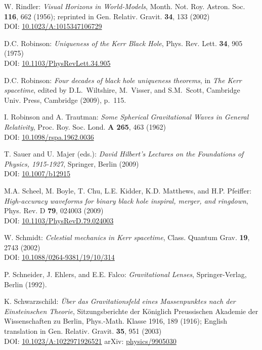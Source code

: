 \begin{thebibliography}{123}
W. Rindler: {\em Visual Horizons in World-Models},
Month. Not. Roy. Astron. Soc. {\bf 116}, 662 (1956);
reprinted in Gen. Relativ. Gravit. {\bf 34}, 133 (2002)\\
DOI: \href{https://doi.org/10.1023/A:1015347106729}{10.1023/A:1015347106729}

D.C. Robinson: {\em Uniqueness of the Kerr Black Hole},
Phys. Rev. Lett. {\bf 34}, 905 (1975)\\
DOI: \href{https://doi.org/10.1103/PhysRevLett.34.905}{10.1103/PhysRevLett.34.905}

D.C. Robinson:
{\em Four decades of black hole uniqueness theorems},
in {\em The Kerr spacetime}, edited by D.L.~Wiltshire, M.~Visser, and S.M.~Scott,
Cambridge Univ. Press, Cambridge (2009), p.~115.

I. Robinson and A. Trautman: {\em Some Spherical Gravitational Waves in General Relativity},
Proc. Roy. Soc. Lond. {\bf A 265}, 463 (1962)\\
DOI: \href{https://doi.org/10.1098/rspa.1962.0036}{10.1098/rspa.1962.0036}

T. Sauer and U. Majer (eds.):
{\em David Hilbert’s Lectures on the Foundations of Physics, 1915-1927},
Springer, Berlin (2009)\\
DOI: \href{https://doi.org/10.1007/b12915}{10.1007/b12915}

M.A. Scheel, M. Boyle, T. Chu, L.E. Kidder, K.D. Matthews, and H.P. Pfeiffer:
{\em High-accuracy waveforms for binary black hole inspiral, merger, and ringdown},
Phys. Rev. D {\bf 79}, 024003 (2009)\\
DOI: \href{https://doi.org/10.1103/PhysRevD.79.024003}{10.1103/PhysRevD.79.024003}

W. Schmidt:
{\em Celestial mechanics in Kerr spacetime},
Class. Quantum Grav. {\bf 19}, 2743 (2002)\\
DOI: \href{https://doi.org/10.1088/0264-9381/19/10/314}{10.1088/0264-9381/19/10/314}

P. Schneider, J. Ehlers, and E.E. Falco:
{\em Gravitational Lenses},
Springer-Verlag, Berlin (1992).

K. Schwarzschild:
{\em \"Uber das Gravitationsfeld eines Massenpunktes nach der Einsteinschen Theorie},
Sitzungsberichte der K\"oniglich Preussischen Akademie der Wissenschaften zu Berlin, Phys.-Math. Klasse 1916, 189 (1916);
English translation in Gen. Relativ. Gravit. {\bf 35}, 951 (2003)\\
DOI: \href{https://doi.org/10.1023/A:1022971926521}{10.1023/A:1022971926521}\hfill
arXiv: \href{https://arxiv.org/abs/physics/9905030}{physics/9905030}


\end{thebibliography}
